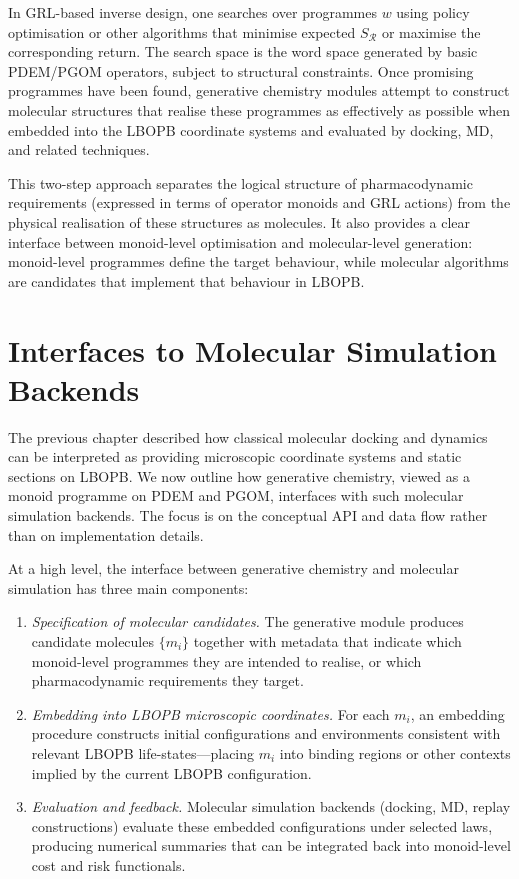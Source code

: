 \documentclass[11pt]{book}
\theoremstyle{plain}
\theoremstyle{definition}
\theoremstyle{remark}
\begin{document}
In GRL-based inverse design, one searches over programmes $w$ using
policy optimisation or other algorithms that minimise expected
$S_{\mathcal{R}}$ or maximise the corresponding return. The search
space is the word space generated by basic PDEM/PGOM operators, subject
to structural constraints. Once promising programmes have been found,
generative chemistry modules attempt to construct molecular structures
that realise these programmes as effectively as possible when embedded
into the LBOPB coordinate systems and evaluated by docking, MD, and
related techniques.

This two-step approach separates the logical structure of pharmacodynamic
requirements (expressed in terms of operator monoids and GRL actions)
from the physical realisation of these structures as molecules. It also
provides a clear interface between monoid-level optimisation and
molecular-level generation: monoid-level programmes define the target
behaviour, while molecular algorithms are candidates that implement
that behaviour in LBOPB.

\section{Interfaces to Molecular Simulation Backends}


The previous chapter described how classical molecular docking and
dynamics can be interpreted as providing microscopic coordinate systems
and static sections on LBOPB. We now outline how generative chemistry,
viewed as a monoid programme on PDEM and PGOM, interfaces with such
molecular simulation backends. The focus is on the conceptual API and
data flow rather than on implementation details.

At a high level, the interface between generative chemistry and
molecular simulation has three main components:
\begin{enumerate}
  \item \emph{Specification of molecular candidates.}
        The generative module produces candidate molecules
        $\{m_{i}\}$ together with metadata that indicate which
        monoid-level programmes they are intended to realise, or which
        pharmacodynamic requirements they target.
  \item \emph{Embedding into LBOPB microscopic coordinates.}
        For each $m_{i}$, an embedding procedure constructs initial
        configurations and environments consistent with relevant
        LBOPB life-states—placing $m_{i}$ into binding regions or
        other contexts implied by the current LBOPB configuration.
  \item \emph{Evaluation and feedback.}
        Molecular simulation backends (docking, MD, replay
        constructions) evaluate these embedded configurations under
        selected laws, producing numerical summaries that can be
        integrated back into monoid-level cost and risk functionals.
\end{enumerate}
\end{document}
